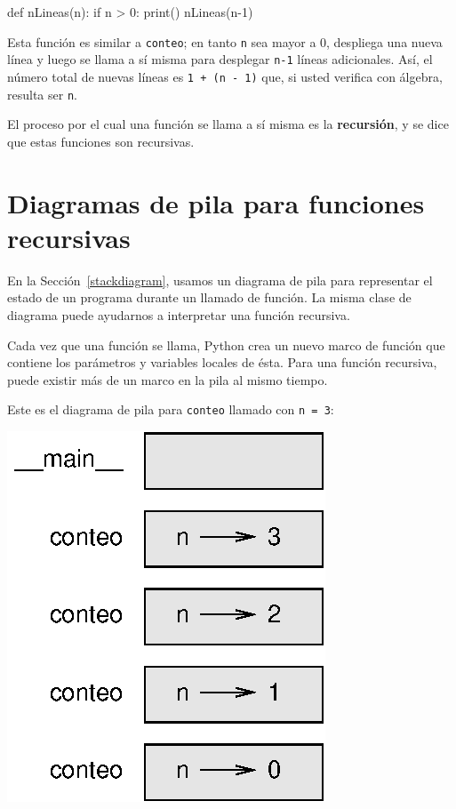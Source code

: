 \begin{pythoncode}
def nLineas(n):
  if n > 0:
    print()
    nLineas(n-1)
\end{pythoncode}
 Esta función es similar a \texttt{conteo}; en tanto \texttt{n} sea
mayor a 0, despliega una nueva línea y luego se llama a sí misma para
desplegar \texttt{n-1} líneas adicionales. Así, el número total de
nuevas líneas es \texttt{1 + (n - 1)} que, si usted verifica con álgebra,
resulta ser \texttt{n}.

El proceso por el cual una función se llama a sí misma es la \textbf{recursión},
y se dice que estas funciones son recursivas.

 

\section{Diagramas de pila para funciones recursivas}

  

En la Sección~\ref{stackdiagram}, usamos un diagrama de pila para
representar el estado de un programa durante un llamado de función.
La misma clase de diagrama puede ayudarnos a interpretar una función
recursiva.

Cada vez que una función se llama, Python crea un nuevo marco de función
que contiene los parámetros y variables locales de ésta. Para una
función recursiva, puede existir más de un marco en la pila al mismo
tiempo.

Este es el diagrama de pila para \texttt{conteo} llamado con \texttt{n
= 3}:

\beforefig \centerline{\includegraphics{illustrations/stack2}}
\afterfig

